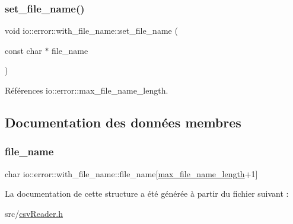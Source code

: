 \subsubsection{\texorpdfstring{set\+\_\+file\+\_\+name()}{set\_file\_name()}}
{\footnotesize\ttfamily void io\+::error\+::with\+\_\+file\+\_\+name\+::set\+\_\+file\+\_\+name (\begin{DoxyParamCaption}\item[{const char $\ast$}]{file\+\_\+name }\end{DoxyParamCaption})\hspace{0.3cm}{\ttfamily [inline]}}



Références io\+::error\+::max\+\_\+file\+\_\+name\+\_\+length.



\subsection{Documentation des données membres}
\mbox{\label{structio_1_1error_1_1with__file__name_ac957d5590a8b95517b74eb5bf373a424}} 
\subsubsection{\texorpdfstring{file\+\_\+name}{file\_name}}
{\footnotesize\ttfamily char io\+::error\+::with\+\_\+file\+\_\+name\+::file\+\_\+name\mbox{[}\hyperlink{namespaceio_1_1error_ac757e93a049ae7a5f23e522933de68e4}{max\+\_\+file\+\_\+name\+\_\+length}+1\mbox{]}}



La documentation de cette structure a été générée à partir du fichier suivant \+:\begin{DoxyCompactItemize}
\item 
src/\hyperlink{csvReader_8h}{csv\+Reader.\+h}\end{DoxyCompactItemize}

